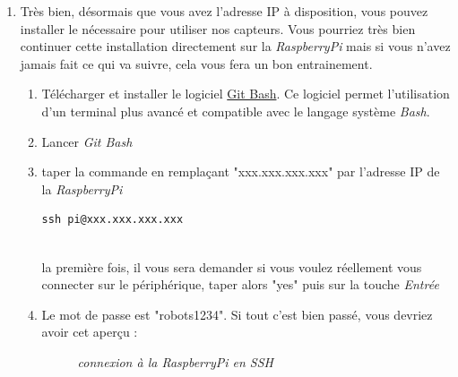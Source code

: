 \begin{enumerate}
	\item Très bien, désormais que vous avez l'adresse IP à disposition, vous pouvez installer le nécessaire pour utiliser nos capteurs. Vous pourriez très bien continuer cette installation directement sur la \textit{RaspberryPi} mais si vous n'avez jamais fait ce qui va suivre, cela vous fera un bon entrainement.\\

\begin{enumerate} 
	\item Télécharger et installer le logiciel \href{https://git-for-windows.github.io/}{Git Bash}. Ce logiciel permet l'utilisation d'un terminal plus avancé et compatible avec le langage système \textit{Bash}.
	\item Lancer \textit{Git Bash}
	\item taper la commande en remplaçant "xxx.xxx.xxx.xxx" par l'adresse IP de la \textit{RaspberryPi}\\
	\begin{lstlisting}[style=MyBashStyle]
	ssh pi@xxx.xxx.xxx.xxx
	\end{lstlisting}\\
la première fois, il vous sera demander si vous voulez réellement vous connecter sur le périphérique, taper alors "yes" puis sur la touche \textit{Entrée}
	\item Le mot de passe est "robots1234". Si tout c'est bien passé, vous devriez avoir cet aperçu :\\
	\begin{figure}[H]
	\begin{center}
	\end{center}
		\caption{ \textit{connexion à la RaspberryPi en SSH}}
	\end{figure}\\
	

\end{enumerate}
\end{enumerate}
